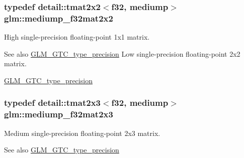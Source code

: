 \subsubsection[{\texorpdfstring{mediump\+\_\+f32mat2x2}{mediump_f32mat2x2}}]{\setlength{\rightskip}{0pt plus 5cm}typedef detail\+::tmat2x2$<$f32, mediump$>$ {\bf glm\+::mediump\+\_\+f32mat2x2}}\hypertarget{group__gtc__type__precision_ga23c9239d6aa9b41c3d2145e2faa81edb}{}\label{group__gtc__type__precision_ga23c9239d6aa9b41c3d2145e2faa81edb}
High single-\/precision floating-\/point 1x1 matrix. \begin{DoxySeeAlso}{See also}
\hyperlink{group__gtc__type__precision}{G\+L\+M\+\_\+\+G\+T\+C\+\_\+type\+\_\+precision} Low single-\/precision floating-\/point 2x2 matrix. 

\hyperlink{group__gtc__type__precision}{G\+L\+M\+\_\+\+G\+T\+C\+\_\+type\+\_\+precision} 
\end{DoxySeeAlso}
\subsubsection[{\texorpdfstring{mediump\+\_\+f32mat2x3}{mediump_f32mat2x3}}]{\setlength{\rightskip}{0pt plus 5cm}typedef detail\+::tmat2x3$<$f32, mediump$>$ {\bf glm\+::mediump\+\_\+f32mat2x3}}\hypertarget{group__gtc__type__precision_ga42497d19668931d225bccf1b9c614c19}{}\label{group__gtc__type__precision_ga42497d19668931d225bccf1b9c614c19}
Medium single-\/precision floating-\/point 2x3 matrix. \begin{DoxySeeAlso}{See also}
\hyperlink{group__gtc__type__precision}{G\+L\+M\+\_\+\+G\+T\+C\+\_\+type\+\_\+precision} 
\end{DoxySeeAlso}
